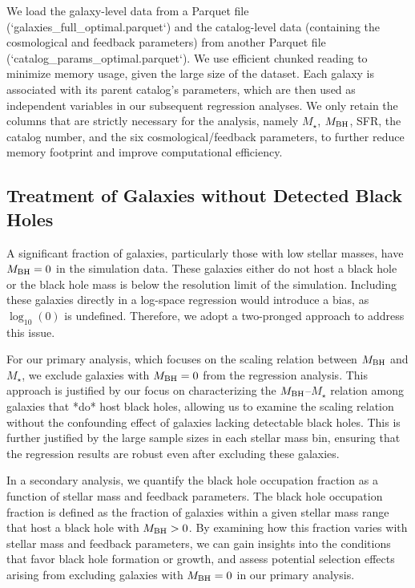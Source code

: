 \documentclass[twocolumn]{aastex631}
\begin{document}
We load the galaxy-level data from a Parquet file (`galaxies_full_optimal.parquet`) and the catalog-level data (containing the cosmological and feedback parameters) from another Parquet file (`catalog_params_optimal.parquet`). We use efficient chunked reading to minimize memory usage, given the large size of the dataset. Each galaxy is associated with its parent catalog's parameters, which are then used as independent variables in our subsequent regression analyses. We only retain the columns that are strictly necessary for the analysis, namely $M_{\star}$, $M_{\rm BH}$, SFR, the catalog number, and the six cosmological/feedback parameters, to further reduce memory footprint and improve computational efficiency.

\subsection{Treatment of Galaxies without Detected Black Holes}

A significant fraction of galaxies, particularly those with low stellar masses, have $M_{\rm BH} = 0$ in the simulation data. These galaxies either do not host a black hole or the black hole mass is below the resolution limit of the simulation. Including these galaxies directly in a log-space regression would introduce a bias, as $\log_{10}(0)$ is undefined. Therefore, we adopt a two-pronged approach to address this issue.

For our primary analysis, which focuses on the scaling relation between $M_{\rm BH}$ and $M_{\star}$, we exclude galaxies with $M_{\rm BH} = 0$ from the regression analysis. This approach is justified by our focus on characterizing the $M_{\rm BH}$--$M_{\star}$ relation among galaxies that *do* host black holes, allowing us to examine the scaling relation without the confounding effect of galaxies lacking detectable black holes. This is further justified by the large sample sizes in each stellar mass bin, ensuring that the regression results are robust even after excluding these galaxies.

In a secondary analysis, we quantify the black hole occupation fraction as a function of stellar mass and feedback parameters. The black hole occupation fraction is defined as the fraction of galaxies within a given stellar mass range that host a black hole with $M_{\rm BH} > 0$. By examining how this fraction varies with stellar mass and feedback parameters, we can gain insights into the conditions that favor black hole formation or growth, and assess potential selection effects arising from excluding galaxies with $M_{\rm BH} = 0$ in our primary analysis.
\end{document}
